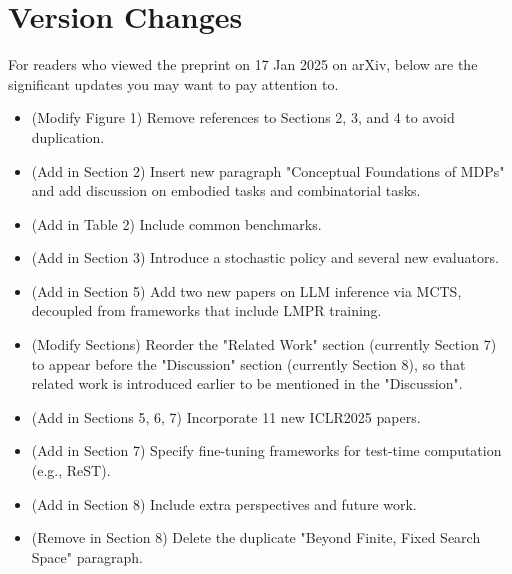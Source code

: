 \section{Version Changes}
For readers who viewed the preprint on 17 Jan 2025 on arXiv, below are the significant updates you may want to pay attention to.
\begin{itemize}
    \item (Modify Figure 1) Remove references to Sections 2, 3, and 4 to avoid duplication.
    \item (Add in Section 2) Insert new paragraph "Conceptual Foundations of MDPs" and add discussion on embodied tasks and combinatorial tasks.
    \item (Add in Table 2) Include common benchmarks.
    \item (Add in Section 3) Introduce a stochastic policy and several new evaluators.
    \item (Add in Section 5) Add two new papers on LLM inference via MCTS, decoupled from frameworks that include LMPR training.
    \item (Modify Sections) Reorder the "Related Work" section (currently Section 7) to appear before the "Discussion" section (currently Section 8), so that related work is introduced earlier to be mentioned in the "Discussion".
    \item (Add in Sections 5, 6, 7) Incorporate 11 new ICLR2025 papers.
    \item (Add in Section 7) Specify fine-tuning frameworks for test-time computation (e.g., ReST).
    \item (Add in Section 8) Include extra perspectives and future work.
    \item (Remove in Section 8) Delete the duplicate "Beyond Finite, Fixed Search Space" paragraph.
\end{itemize}

